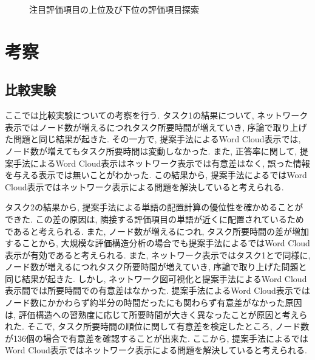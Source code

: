 \documentclass[syuuron]{kuee}
\begin{document}
		\begin{figure}
			\begin{center}
			\end{center}
			\caption{注目評価項目の上位及び下位の評価項目探索}
	  		\label{fig:cas2}
		\end{figure}
			
\chapter{考察}
	\section{比較実験}
	ここでは比較実験についての考察を行う. 
	タスク1の結果について, ネットワーク表示ではノード数が増えるにつれタスク所要時間が増えていき, 序論で取り上げた問題と同じ結果が起きた. 
	その一方で, 提案手法によるWord Cloud表示では, ノード数が増えてもタスク所要時間は変動しなかった. 
	また, 正答率に関して, 提案手法によるWord Cloud表示はネットワーク表示では有意差はなく, 誤った情報を与える表示では無いことがわかった. 
	この結果から, 提案手法によるではWord Cloud表示ではネットワーク表示による問題を解決していると考えられる. 
	
	タスク2の結果から, 提案手法による単語の配置計算の優位性を確かめることができた. 
	この差の原因は, 隣接する評価項目の単語が近くに配置されているためであると考えられる. 
	また, ノード数が増えるにつれ, タスク所要時間の差が増加することから, 大規模な評価構造分析の場合でも提案手法によるではWord Cloud表示が有効であると考えられる. 
	また, ネットワーク表示ではタスク1とで同様に, ノード数が増えるにつれタスク所要時間が増えていき, 序論で取り上げた問題と同じ結果が起きた. 
	しかし, ネットワーク図可視化と提案手法によるWord Cloud表示間では所要時間での有意差はなかった. 
	提案手法によるWord Cloud表示ではノード数にかかわらず約半分の時間だったにも関わらず有意差がなかった原因は, 
	評価構造への習熟度に応じて所要時間が大きく異なったことが原因と考えられた. 
	そこで, タスク所要時間の順位に関して有意差を検定したところ, ノード数が136個の場合で有意差を確認することが出来た. 
	ここから, 提案手法によるではWord Cloud表示ではネットワーク表示による問題を解決していると考えられる. 
	
\end{document}
